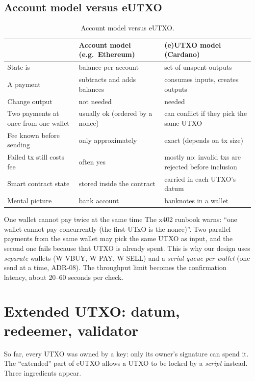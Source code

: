 \subsection{Account model versus eUTXO}

\begin{table}[h]
\centering
\small
\begin{tabularx}{\textwidth}{@{}p{3.5cm}XX@{}}
\toprule
 & \textbf{Account model (e.g.\ Ethereum)} & \textbf{(e)UTXO model (Cardano)}\\
\midrule
State is & balance per account & set of unspent outputs\\
A payment & subtracts and adds balances & consumes inputs, creates outputs\\
Change output & not needed & needed\\
Two payments at once from one wallet & usually ok (ordered by a nonce) & can conflict if they pick the same UTXO\\
Fee known before sending & only approximately & exact (depends on tx size)\\
Failed tx still costs fee & often yes & mostly no: invalid txs are rejected before inclusion\\
Smart contract state & stored inside the contract & carried in each UTXO's datum\\
Mental picture & bank account & banknotes in a wallet\\
\bottomrule
\end{tabularx}
\caption{Account model versus eUTXO.}
\end{table}

\begin{shelfiebox}{One wallet cannot pay twice at the same time}
The x402 runbook warns: ``one wallet cannot pay concurrently (the first UTxO is the nonce)''. Two parallel payments from the same wallet may pick the same UTXO as input, and the second one fails because that UTXO is already spent. This is why our design uses \emph{separate} wallets (W-VBUY, W-PAY, W-SELL) and a \emph{serial queue per wallet} (one send at a time, ADR-08). The throughput limit becomes the confirmation latency, about 20--60 seconds per check.
\end{shelfiebox}

\section{Extended UTXO: datum, redeemer, validator}

So far, every UTXO was owned by a key: only its owner's signature can spend it. The ``extended'' part of eUTXO allows a UTXO to be locked by a \emph{script} instead. Three ingredients appear.

